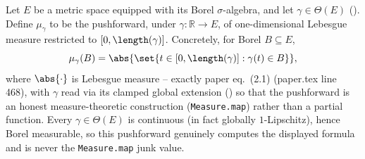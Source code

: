 \begin{definition}
  Let $E$ be a metric space equipped with its Borel $\sigma$-algebra, and let $\gamma \in \Theta(E)$
  (). Define $\mu_\gamma$ to be the pushforward, under $\gamma \colon \mathbb{R} \to E$,
  of one-dimensional Lebesgue measure restricted to $[0,\length(\gamma)]$. Concretely, for Borel
  $B \subseteq E$,
  \[
    \mu_\gamma(B) = \abs{\set{t \in [0,\length(\gamma)] : \gamma(t) \in B}}
    ,
  \]
  where $\abs{\cdot}$ is Lebesgue measure -- exactly paper eq.~(2.1) (paper.tex line 468), with
  $\gamma$ read via its clamped global extension () so that the pushforward is an
  honest measure-theoretic construction (\texttt{Measure.map}) rather than a partial function.
  Every $\gamma \in \Theta(E)$ is continuous (in fact globally $1$-Lipschitz), hence Borel
  measurable, so this pushforward genuinely computes the displayed formula and is never the
  \texttt{Measure.map} junk value.
\end{definition}
